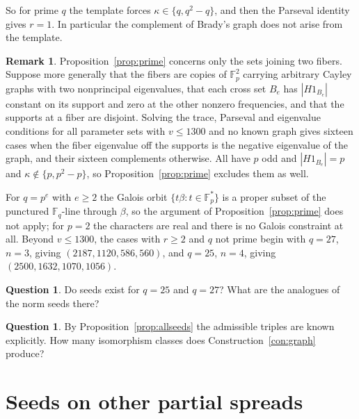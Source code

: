 \documentclass[11pt]{amsart}
\theoremstyle{definition}
\newtheorem{remark}[theorem]{Remark}
\newtheorem{question}[theorem]{Question}
\newcommand{\F}{\mathbb{F}}
\begin{document}
So for prime $q$ the template forces $\kappa\in\{q,q^2-q\}$, and then the Parseval identity gives $r=1$. In particular the complement of Brady's graph does not arise from the template.

\begin{remark}\label{rem:relaxed}
Proposition~\ref{prop:prime} concerns only the sets joining two fibers. Suppose more generally that the fibers are copies of $\F_p^2$ carrying arbitrary Cayley graphs with two nonprincipal eigenvalues, that each cross set $B_e$ has $|H1_{B_e}|$ constant on its support and zero at the other nonzero frequencies, and that the supports at a fiber are disjoint. Solving the trace, Parseval and eigenvalue conditions for all parameter sets with $v\le1300$ and no known graph gives sixteen cases when the fiber eigenvalue off the supports is the negative eigenvalue of the graph, and their sixteen complements otherwise. All have $p$ odd and $|H1_{B_e}|=p$ and $\kappa\notin\{p,p^2-p\}$, so Proposition~\ref{prop:prime} excludes them as well.
\end{remark}

For $q=p^e$ with $e\ge2$ the Galois orbit $\{t\beta:t\in\F_p^*\}$ is a proper subset of the punctured $\F_q$-line through $\beta$, so the argument of Proposition~\ref{prop:prime} does not apply; for $p=2$ the characters are real and there is no Galois constraint at all. Beyond $v\le1300$, the cases with $r\ge2$ and $q$ not prime begin with $q=27$, $n=3$, giving $(2187,1120,586,560)$, and $q=25$, $n=4$, giving $(2500,1632,1070,1056)$.

\begin{question}
Do seeds exist for $q=25$ and $q=27$? What are the analogues of the norm seeds there?
\end{question}

\begin{question}
By Proposition~\ref{prop:allseeds} the admissible triples are known explicitly. How many isomorphism classes does Construction~\ref{con:graph} produce?
\end{question}

\section{Seeds on other partial spreads}\label{sec:jordan}
\end{document}
